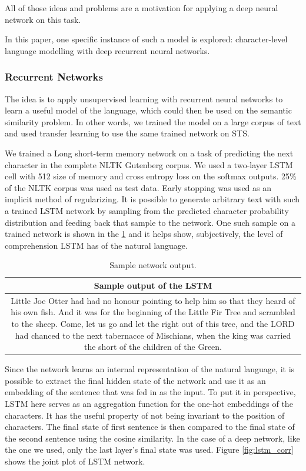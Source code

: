 \documentclass[10pt, a4paper]{article}
\begin{document}
All of those ideas and problems are a motivation for applying a deep neural network on this task.

In this paper, one specific instance of such a model is explored: character-level language modelling with deep recurrent neural networks.

\subsubsection{Recurrent Networks}

The idea is to apply unsupervised learning with recurrent neural networks to learn a useful model of the language, which could then be used on the semantic similarity problem.
In other words, we trained the model on a large corpus of text and used transfer learning to use the same trained network on STS.

We trained a Long short-term memory network \citep{LSTM} on a task of predicting the next character in the complete NLTK Gutenberg corpus. 
We used a two-layer LSTM cell with 512 size of memory and cross entropy loss on the softmax outputs.
25\% of the NLTK corpus was used as test data. Early stopping was used as an implicit method of regularizing.
It is possible to generate arbitrary text with such a trained LSTM network by sampling from the predicted character probability distribution and feeding back that sample to the network. 
One such sample on a trained network is shown in the \ref{tab:sample_output} and it helps show, subjectively, the level of comprehension LSTM has of the natural language.

\begin{table}
\caption{Sample network output.}
\label{tab:sample_output}
\begin{center}
\begin{tabular}{c}
\toprule
Sample output of the LSTM \\
\midrule
\multicolumn{1}{m{6.5cm}}{Little Joe Otter had had no honour pointing to help him so that they
heard of his own fish.  And it was for the beginning of the Little Fir Tree and
scrambled to the sheep. 
Come, let us go and let the right out of this tree, and the LORD had chanced
to the next tabernacce of Mischians, when the king was carried the short of the children of the Green.}
\bottomrule
\end{tabular}
\end{center}
\end{table}

Since the network learns an internal representation of the natural language, it is possible to extract the final hidden state of the network and use it as an embedding of the sentence that was fed in as the input.
To put it in perspective, LSTM here serves as an aggregation function for the one-hot embeddings of the characters. 
It has the useful property of not being invariant to the position of characters.
The final state of first sentence is then compared to the final state of the second sentence using the cosine similarity. 
In the case of a deep network, like the one we used, only the last layer's final state was used.
Figure \ref{fig:lstm_corr} shows the joint plot of LSTM network.
\end{document}
